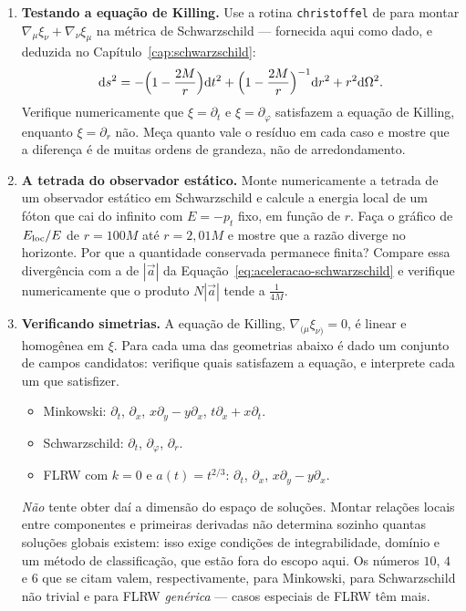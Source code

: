 \documentclass[12pt,a4paper,oneside]{book}
\theoremstyle{rgplain}
\theoremstyle{rgremark}
\begin{document}
\begin{enumerate}
  \item \textbf{Testando a equação de Killing.} Use a rotina \texttt{christoffel} de
 para montar $\nabla_\mu\xi_\nu+\nabla_\nu\xi_\mu$
na métrica de Schwarzschild --- fornecida aqui como dado, e deduzida no
Capítulo~\ref{cap:schwarzschild}:
\[
  \mathrm{d} s^2=-\Bigl(1-\frac{2M}{r}\Bigr)\mathrm{d} t^2
  +\Bigl(1-\frac{2M}{r}\Bigr)^{-1}\mathrm{d} r^2+r^2\mathrm{d}\Omega^2 .
\]
Verifique numericamente que $\xi=\partial_t$ e
$\xi=\partial_\varphi$ satisfazem a equação de Killing, enquanto
$\xi=\partial_r$ não. Meça quanto vale o resíduo em cada caso e mostre que a
diferença é de muitas ordens de grandeza, não de arredondamento.

  \item \textbf{A tetrada do observador estático.} Monte numericamente a tetrada de
um observador estático em Schwarzschild e calcule a energia local de um
fóton que cai do infinito com $E=-p_t$ fixo, em função de $r$. Faça o
gráfico de $E_{\rm loc}/E$ de $r=100M$ até $r=2{,}01M$ e mostre que a razão
diverge no horizonte. Por que a quantidade conservada permanece finita? Compare
essa divergência com a de $|\vec a|$ da
Equação~\eqref{eq:aceleracao-schwarzschild} e verifique numericamente que o
produto $N|\vec a|$ tende a $\frac{1}{4M}$.

  \item \textbf{Verificando simetrias.} A equação de Killing,
$\nabla_{(\mu}\xi_{\nu)}=0$, é linear e homogênea em $\xi$. Para cada uma
das geometrias abaixo é dado um conjunto de campos candidatos: verifique
quais satisfazem a equação, e interprete cada um que satisfizer.
\begin{itemize}
  \item Minkowski: $\partial_t$, $\partial_x$, $x\partial_y-y\partial_x$,
  $t\partial_x+x\partial_t$.
  \item Schwarzschild: $\partial_t$, $\partial_\varphi$,
  $\partial_r$.
  \item FLRW com $k=0$ e $a(t)=t^{2/3}$: $\partial_t$, $\partial_x$,
  $x\partial_y-y\partial_x$.
\end{itemize}
\emph{Não} tente obter daí a dimensão do espaço de soluções. Montar relações
locais entre componentes e primeiras derivadas não determina sozinho quantas
soluções globais existem: isso exige condições de integrabilidade, domínio e
um método de classificação, que estão fora do escopo aqui. Os números $10$,
$4$ e $6$ que se citam valem, respectivamente, para Minkowski, para
Schwarzschild não trivial e para FLRW \emph{genérica} --- casos especiais de
FLRW têm mais.
\end{enumerate}
\end{document}

